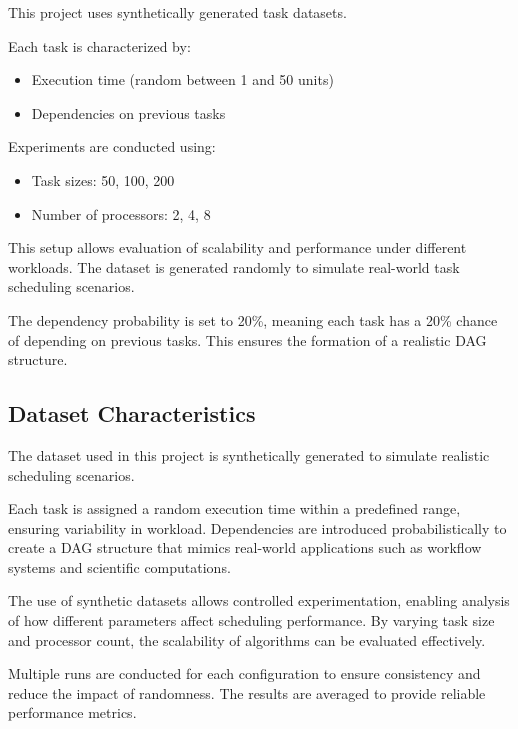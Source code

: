 \documentclass[12pt,a4paper]{article}
\begin{document}
This project uses synthetically generated task datasets.

Each task is characterized by:
\begin{itemize}
\item Execution time (random between 1 and 50 units)
\item Dependencies on previous tasks
\end{itemize}

Experiments are conducted using:
\begin{itemize}
\item Task sizes: 50, 100, 200
\item Number of processors: 2, 4, 8
\end{itemize}
This setup allows evaluation of scalability and performance under different workloads.
The dataset is generated randomly to simulate real-world task scheduling scenarios.

The dependency probability is set to 20\%, meaning each task has a 20\% chance of depending on previous tasks. This ensures the formation of a realistic DAG structure.
\subsection*{Dataset Characteristics}

The dataset used in this project is synthetically generated to simulate realistic scheduling scenarios.

Each task is assigned a random execution time within a predefined range, ensuring variability in workload. Dependencies are introduced probabilistically to create a DAG structure that mimics real-world applications such as workflow systems and scientific computations.

The use of synthetic datasets allows controlled experimentation, enabling analysis of how different parameters affect scheduling performance. By varying task size and processor count, the scalability of algorithms can be evaluated effectively.

Multiple runs are conducted for each configuration to ensure consistency and reduce the impact of randomness. The results are averaged to provide reliable performance metrics.


   \newpage

\end{document}
